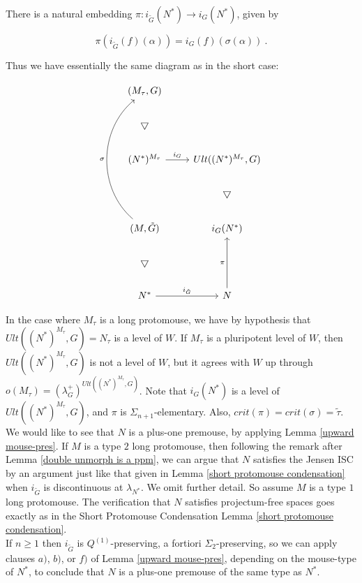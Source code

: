 \documentclass[12pt]{article}
\begin{document}
There is a natural embedding $\pi: i_{\tilde{G}}(N^* ) \longrightarrow i_G ( N^* )$, given by 

\[
\pi ( i_{\tilde{G}} (f) (\alpha)) = i_G (f)(\sigma (\alpha )) \ .
\]

\smallskip

Thus we have essentially the same diagram as in the short case:


\[
\begin{tikzcd}
( M_\tau , G ) & \\
\bigtriangledown & \\
(N^*)^{M_\tau} \arrow[r, "i_G"] & Ult ((N^*)^{M_\tau} , G ) \\
& \bigtriangledown \\
( M , \tilde{G} ) \arrow[to=1-1, bend left=50, "\sigma"] & i_{G}(N^* ) \\
\bigtriangledown & \\
N^* \arrow[r, "i_{\tilde{G}}"] & N \arrow[to=5-2 , "\pi"]
\end{tikzcd}
\]
 
 \smallskip
 
 
 In the case where $M_\tau$ is a long protomouse, we have by hypothesis that $Ult ((N^*)^{M_\tau} , G ) = N_\tau$ is a level of $W$.  If $M_\tau$ is a pluripotent level of $W$, then $Ult ((N^*)^{M_\tau} , G )$ is not a level of $W$, but it agrees with $W$ up through $o(M_\tau) = (\lambda_G^+)^{Ult ((N^*)^{M_\tau} , G )}$.  Note that $i_{G}(N^* )$ is a level of $Ult ((N^*)^{M_\tau} , G )$, and $\pi$ is $\Sigma_{n+1}$-elementary.  Also, $crit (\pi ) = crit (\sigma ) = \tilde{\tau }$. \\


We would like to see that $N$ is a plus-one premouse, by applying Lemma \ref{upward mouse-pres}.  If $M$ is a type $2$ long protomouse, then following the remark after Lemma \ref{double unmorph is a ppm}, we can argue that $N$ satisfies the Jensen ISC by an argument just like that given in Lemma \ref{short protomouse condensation} when $i_{\tilde{G}}$ is discontinuous at $\lambda_{N^*}$.  We omit further detail.  So assume $M$ is a type $1$ long protomouse.  The verification that $N$ satisfies projectum-free spaces goes exactly as in the Short Protomouse Condensation Lemma \ref{short protomouse condensation}.\\



 If $n \geq 1$ then $i_{\tilde{G}}$ is $Q^{(1)}$-preserving, a fortiori $\Sigma_2$-preserving, so we can apply clauses $a)$, $b)$, or $f)$ of Lemma \ref{upward mouse-pres}, depending on the mouse-type of $N^*$, to conclude that $N$ is a plus-one premouse of the same type as $N^*$.\\
\end{document}
